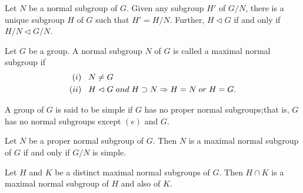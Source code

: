 \begin{coro}
    Let $N$ be a normal subgroup of $G$. Given any subgroup $H'$ of $G/N$, there is a unique subgroup $H$ of $G$ such that $H'=H/N$. Further, $H\vartriangleleft G$ if and only if $H/N\vartriangleleft G/N$.
\end{coro}
\begin{defi}
 Let $G$ be a group. A normal subgroup $N$ of $G$ is called a maximal normal subgroup if
 \begin{align*}
     (i)&\hspace{.3cm}N\neq G\\
     (ii)&\hspace{.3cm}H\vartriangleleft G\hspace{.1cm}and\hspace{.1cm}H\supset N\Rightarrow H=N\hspace{.1cm}or\hspace{.1cm}H=G.
 \end{align*}
\end{defi}
\begin{defi}
    A group of $G$ is said  to be simple if $G$ has no proper normal subgroups;that is, $G$ has no normal subgroups except $(e)$ and $G$.
\end{defi}
\begin{coro}
    Let $N$ be a proper normal subgroup of $G$. Then $N$ is a maximal normal subgroup of $G$ if and only if $G/N$ is simple.
\end{coro}
\begin{coro}
    Let $H$ and $K$ be a distinct maximal normal subgroups of $G$. Then $H\cap K$ is a maximal normal subgroup of $H$ and also of $K$.
\end{coro}
